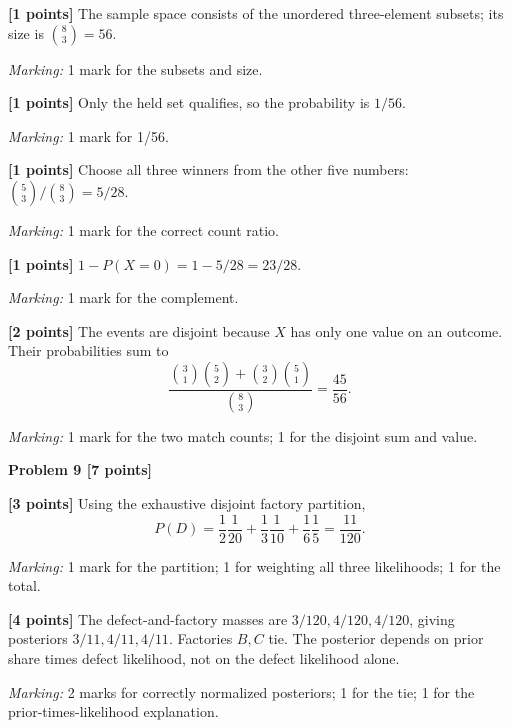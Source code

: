 \documentclass[12pt,letterpaper]{article}
\newcommand{\problemheading}[2][5\baselineskip]{\Needspace{#1}\par\noindent\hspace*{-0.625in}\textbf{#2}\par\nobreak\vspace{0.3em}}
\begin{document}
\begin{description}[font=\normalfont,leftmargin=1.2em,labelsep=0.4em]
\item[(a)] \textbf{[1 points]} The sample space consists of the unordered three-element subsets; its size is $\binom83=56$.
\par\textit{Marking:} 1 mark for the subsets and size.
\item[(b)] \textbf{[1 points]} Only the held set qualifies, so the probability is $1/56$.
\par\textit{Marking:} 1 mark for 1/56.
\item[(c)] \textbf{[1 points]} Choose all three winners from the other five numbers: $\binom53/\binom83=5/28$.
\par\textit{Marking:} 1 mark for the correct count ratio.
\item[(d)] \textbf{[1 points]} $1-P(X=0)=1-5/28=23/28$.
\par\textit{Marking:} 1 mark for the complement.
\item[(e)] \textbf{[2 points]} The events are disjoint because $X$ has only one value on an outcome. Their probabilities sum to\[\frac{\binom31\binom52+\binom32\binom51}{\binom83}=\frac{45}{56}.\]
\par\textit{Marking:} 1 mark for the two match counts; 1 for the disjoint sum and value.
\end{description}
\vspace{0.65em}
\problemheading[\dimexpr 3\baselineskip+4\baselineskip\relax]{Problem 9 [7 points]}
\begin{description}[font=\normalfont,leftmargin=1.2em,labelsep=0.4em]
\item[(a)] \textbf{[3 points]} Using the exhaustive disjoint factory partition,\[P(D)=\frac12\frac1{20}+\frac13\frac1{10}+\frac16\frac15=\frac{11}{120}.\]
\par\textit{Marking:} 1 mark for the partition; 1 for weighting all three likelihoods; 1 for the total.
\item[(b)] \textbf{[4 points]} The defect-and-factory masses are $3/120,4/120,4/120$, giving posteriors $3/11,4/11,4/11$. Factories $B,C$ tie. The posterior depends on prior share times defect likelihood, not on the defect likelihood alone.
\par\textit{Marking:} 2 marks for correctly normalized posteriors; 1 for the tie; 1 for the prior-times-likelihood explanation.
\end{description}
\end{document}
